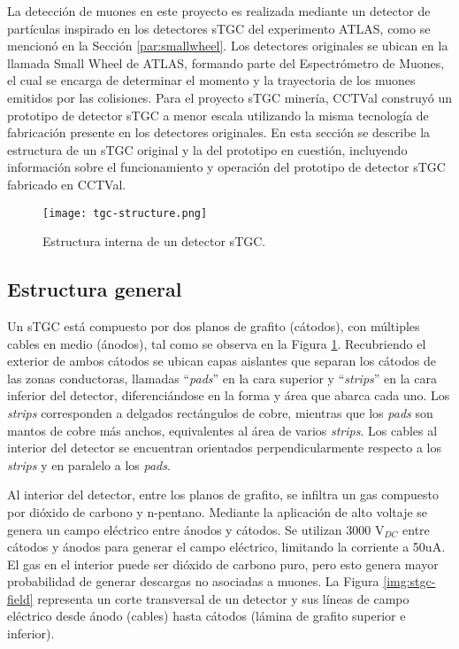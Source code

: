 
La detección de muones en este proyecto es realizada mediante un detector de partículas inspirado en los detectores sTGC del experimento ATLAS, como se mencionó en la Sección \ref{par:smallwheel}. Los detectores originales se ubican en la llamada Small Wheel de ATLAS, formando parte del Espectrómetro de Muones, el cual se encarga de determinar el momento y la trayectoria de los muones emitidos por las colisiones. Para el proyecto sTGC minería, CCTVal construyó un prototipo de detector sTGC a menor escala utilizando la misma tecnología de fabricación presente en los detectores originales. En esta sección se describe la estructura de un sTGC original y la del prototipo en cuestión, incluyendo información sobre el funcionamiento y operación del prototipo de detector sTGC fabricado en CCTVal.

\begin{figure}[h]
	\centering
	\texttt{[image: tgc-structure.png]}
	\caption{Estructura interna de un detector sTGC\cite{Chapman2014ATLASUpgrade}.}
	\label{img:stgc-structure}
\end{figure}

\subsection{Estructura general} 
	Un sTGC está compuesto por dos planos de grafito (cátodos), con múltiples cables en medio (ánodos)\cite{Formenti2018CERNReport}, tal como se observa en la Figura \ref{img:stgc-structure}. Recubriendo el exterior de ambos cátodos se ubican capas aislantes que separan los cátodos de las zonas conductoras, llamadas ``\textit{pads}'' en la cara superior y ``\textit{strips}'' en la cara inferior del detector, diferenciándose en la forma y área que abarca cada uno. Los \textit{strips} corresponden a delgados rectángulos de cobre, mientras que los \textit{pads} son mantos de cobre más anchos, equivalentes al área de varios \textit{strips}. Los cables al interior del detector se encuentran orientados perpendicularmente respecto a los \textit{strips} y en paralelo a los \textit{pads}.
	
	\newpage
	Al interior del detector, entre los planos de grafito, se infiltra un gas compuesto por dióxido de carbono y n-pentano\cite{Formenti2018CERNReport}. Mediante la aplicación de alto voltaje se genera un campo eléctrico entre ánodos y cátodos. Se utilizan 3000 V$_{DC}$ entre cátodos y ánodos para generar el campo eléctrico, limitando la corriente a 50uA. El gas en el interior puede ser dióxido de carbono puro, pero esto genera mayor probabilidad de generar descargas no asociadas a muones. La Figura \ref{img:stgc-field} representa un corte transversal de un detector y sus líneas de campo eléctrico desde ánodo (cables) hasta cátodos (lámina de grafito superior e inferior). 
	
